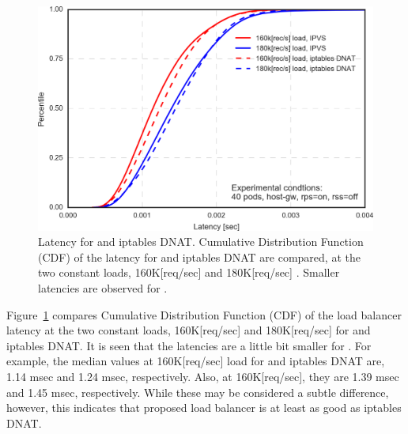 \begin{figure}[h]
  \centering
  \includegraphics[width=0.75\columnwidth]{Figs/latency_cdf_rps_40pods}
  \par\bigskip
  \centering
  \begin{minipage}{0.9\columnwidth}
    \caption[Latency for IPVS and iptables DNAT]{
      Latency for  and iptables DNAT.
      Cumulative Distribution Function (CDF) of the latency for  and iptables DNAT are compared, at the two constant loads, 160K[req/sec] and 180K[req/sec] .
      Smaller latencies are observed for .
}
    \label{fig:latency_cdf_rps_40pods}
  \end{minipage}
\end{figure}

Figure~\ref{fig:latency_cdf_rps_40pods} compares Cumulative Distribution Function (CDF) of the load balancer latency at the two constant loads, 160K[req/sec] and 180K[req/sec] for  and iptables DNAT.
It is seen that the latencies are a little bit smaller for .
For example, the median values at 160K[req/sec] load for  and iptables DNAT are, 1.14 msec and 1.24 msec, respectively.
Also, at 160K[req/sec], they are 1.39 msec and 1.45 msec, respectively.
%
While these may be considered a subtle difference, however, this indicates that proposed load balancer is at least as good as iptables DNAT.


